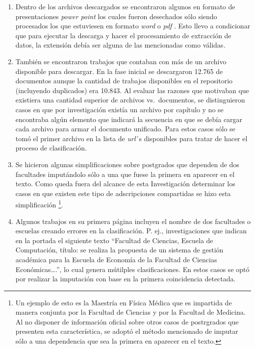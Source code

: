 \documentclass[
  12pt,
  openany]{book}
\begin{document}
\begin{enumerate}
  Con este último método se pudieron clasificar 1.658 trabajos, que equivalen a un 16,6\% del total. Es importante señalar que al aplicar este recurso se pueden generar ``falsos positivos'' y por esto en la Sección \ref{pruebas} se hace una estimación estadística del error que puede representar acudir a este método.
\item
  Dentro de los archivos descargados se encontraron algunos en formato de presentaciones \emph{power point} los cuales fueron desechados sólo siendo procesados los que estuviesen en formato \emph{word} o \emph{pdf} . Esto llevo a condicionar que para ejecutar la descarga y hacer el procesamiento de extracción de datos, la extensión debía ser alguna de las mencionadas como válidas\emph{.}
\item
  También se encontraron trabajos que contaban con más de un archivo disponible para descargar. En la fase inicial se descargaron 12.765 de documentos aunque la cantidad de trabajos disponibles en el repositorio (incluyendo duplicados) era 10.843. Al evaluar las razones que motivaban que existiera una cantidad superior de archivos vs.~documentos, se distinguieron casos en que por investigación existía un archivo por capítulo y no se encontraba algún elemento que indicará la secuencia en que se debía cargar cada archivo para armar el documento unificado. Para estos casos sólo se tomó el primer archivo en la lista de \emph{url}´s disponibles para tratar de hacer el proceso de clasificación.
\item
  Se hicieron algunas simplificaciones sobre postgrados que dependen de dos facultades imputándolo sólo a una que fuese la primera en aparecer en el texto. Como queda fuera del alcance de esta Investigación determinar los casos en que existen este tipo de adscripciones compartidas se hizo esta simplificación \footnote{Un ejemplo de esto es la Maestría en Física Médica que es impartida de manera conjunta por la Facultad de Ciencias y por la Facultad de Medicina. Al no disponer de información oficial sobre otros casos de postrgrados que presenten esta característica, se adoptó el método mencionado de imputar sólo a una dependencia que sea la primera en aparecer en el texto.}.
\item
  Algunos trabajos en su primera página incluyen el nombre de dos facultades o escuelas creando errores en la clasificación. P. ej., investigaciones que indican en la portada el siguiente texto ``Facultad de Ciencias, Escuela de Computación, título: se realiza la propuesta de un sistema de gestión académica para la Escuela de Economía de la Facultad de Ciencias Económicas\ldots.'', lo cual genera mútilples clasificaciones. En estos casos se optó por realizar la imputación con base en la primera coincidencia detectada.

\end{enumerate}
\end{document}
